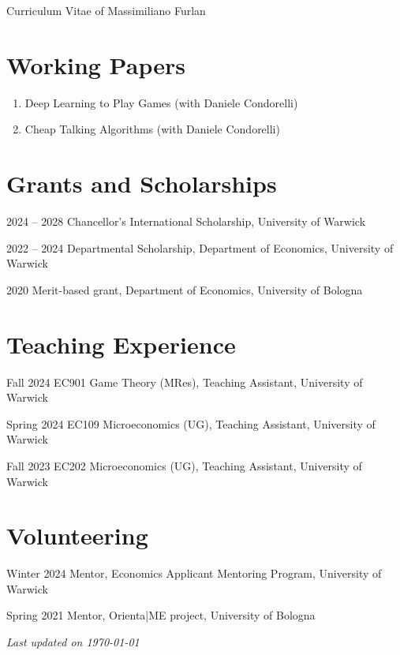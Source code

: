 \documentclass[11pt,a4paper]{article}
\begin{document}
\begin{cv}{\LARGE Curriculum Vitae of Massimiliano Furlan}
\section{Working Papers}
\begin{enumerate}[label=\arabic*., itemsep=0pt, leftmargin=16pt]
    \item Deep Learning to Play Games (with Daniele Condorelli)
    \item Cheap Talking Algorithms (with Daniele Condorelli)
\end{enumerate}
\vspace{-15pt}

\section{Grants and Scholarships}
\begin{cvlist}{}
	\itemsep -4pt
	\item[2024 -- 2028] Chancellor's International Scholarship, University of Warwick 
	\item[2022 -- 2024] Departmental Scholarship, Department of Economics, University of Warwick 
	\item[2020] Merit-based grant, Department of Economics, University of Bologna
\end{cvlist}
\vspace{-15pt}

\section{Teaching Experience}
\begin{cvlist}{}
  	\itemsep -4pt
	\item[Fall 2024] EC901 Game Theory (MRes), Teaching Assistant, University of Warwick
	\item[Spring 2024] EC109 Microeconomics (UG), Teaching Assistant, University of Warwick
	\item[Fall 2023] EC202 Microeconomics (UG), Teaching Assistant, University of Warwick
\end{cvlist}
\vspace{-15pt}

\section{Volunteering}
\begin{cvlist}{}
  	\itemsep -4pt
	\item[Winter 2024] Mentor, Economics Applicant Mentoring Program, University of Warwick
        \item[Spring 2021] Mentor, Orienta|ME project, University of Bologna
\end{cvlist}


\end{cv}

\begin{flushright}
    \textit{Last updated on \today}
\end{flushright}
\end{document}
